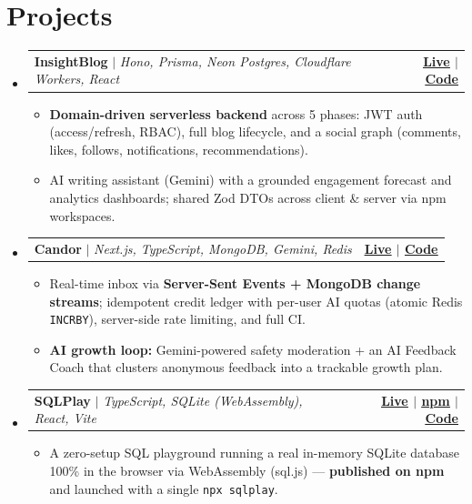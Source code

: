 \documentclass[letterpaper,11pt]{article}
\makeatletter
\newcommand{\resumeItem}[1]{
  \item\small{
    {#1 \vspace{-2pt}}
  }
}
\newcommand{\resumeProjectHeading}[2]{
    \item
    \begin{tabular*}{1.001\textwidth}{l@{\extracolsep{\fill}}r}
      \small#1 & \textbf{\small #2}\\
    \end{tabular*}\vspace{-7pt}
}
\newcommand{\resumeSubHeadingListStart}{\begin{itemize}[leftmargin=0.0in, label={}]}
\newcommand{\resumeSubHeadingListEnd}{\end{itemize}}
\newcommand{\resumeItemListStart}{\begin{itemize}}
\newcommand{\resumeItemListEnd}{\end{itemize}\vspace{-5pt}}
\makeatother
\begin{document}
\section{Projects}
    \vspace{-5pt}
    \resumeSubHeadingListStart
      \resumeProjectHeading
          {\textbf{InsightBlog} $|$ \emph{Hono, Prisma, Neon Postgres, Cloudflare Workers, React}}{\href{https://insightblog-one.vercel.app}{\underline{Live}} $|$ \href{https://github.com/Yogesh0627/Full_Stack_Project}{\underline{Code}}}
          \resumeItemListStart
            \resumeItem{\textbf{Domain-driven serverless backend} across 5 phases: JWT auth (access/refresh, RBAC), full blog lifecycle, and a social graph (comments, likes, follows, notifications, recommendations).}
            \resumeItem{AI writing assistant (Gemini) with a grounded engagement forecast and analytics dashboards; shared Zod DTOs across client \& server via npm workspaces.}
          \resumeItemListEnd
          \vspace{-13pt}
      \resumeProjectHeading
          {\textbf{Candor} $|$ \emph{Next.js, TypeScript, MongoDB, Gemini, Redis}}{\href{https://candor-cyan.vercel.app}{\underline{Live}} $|$ \href{https://github.com/Yogesh0627/anonymous-message-app}{\underline{Code}}}
          \resumeItemListStart
            \resumeItem{Real-time inbox via \textbf{Server-Sent Events + MongoDB change streams}; idempotent credit ledger with per-user AI quotas (atomic Redis \texttt{INCRBY}), server-side rate limiting, and full CI.}
            \resumeItem{\textbf{AI growth loop:} Gemini-powered safety moderation + an AI Feedback Coach that clusters anonymous feedback into a trackable growth plan.}
          \resumeItemListEnd
          \vspace{-13pt}
      \resumeProjectHeading
          {\textbf{SQLPlay} $|$ \emph{TypeScript, SQLite (WebAssembly), React, Vite}}{\href{https://sqlplay.vercel.app}{\underline{Live}} $|$ \href{https://www.npmjs.com/package/sqlplay}{\underline{npm}} $|$ \href{https://github.com/Yogesh0627/sqlplay}{\underline{Code}}}
          \resumeItemListStart
            \resumeItem{A zero-setup SQL playground running a real in-memory SQLite database 100\% in the browser via WebAssembly (sql.js) --- \textbf{published on npm} and launched with a single \texttt{npx sqlplay}.}
          \resumeItemListEnd
    \resumeSubHeadingListEnd
\vspace{-9pt}

\end{document}
